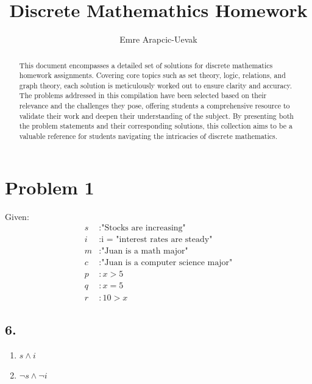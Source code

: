 \documentclass[a4paper, 10pt]{article}
\title{Discrete Mathemathics Homework}
\author{Emre Arapcic-Uevak}
\date{}
\begin{document}
	\maketitle
	\vspace{5mm}
	
	\begin{abstract}
		\begin{center}
			\noindent This document encompasses a detailed set of solutions for discrete mathematics homework assignments. Covering core topics such as set theory, logic, relations, and graph theory, each solution is meticulously worked out to ensure clarity and accuracy. The problems addressed in this compilation have been selected based on their relevance and the challenges they pose, offering students a comprehensive resource to validate their work and deepen their understanding of the subject. By presenting both the problem statements and their corresponding solutions, this collection aims to be a valuable reference for students navigating the intricacies of discrete mathematics.
		\end{center}
	\end{abstract}
	\pagebreak
	
	\tableofcontents
	\pagebreak

    \section{Problem 1}
        Given:
        \begin{align*}
            s &: \text{"Stocks are increasing"} \\
            i &: \text{i = "interest rates are steady"} \\
            m &: \text{"Juan is a math major"} \\
            c &: \text{"Juan is a computer science major"} \\
            p &: x > 5 \\
            q &: x = 5 \\
            r &: 10 > x
        \end{align*}
	
        \subsection*{6.}
            \begin{enumerate}[label=\alph*.]
                \item \( s \land  i \)
                \item \( \neg s \land \neg i \)
            \end{enumerate}
\end{document}
